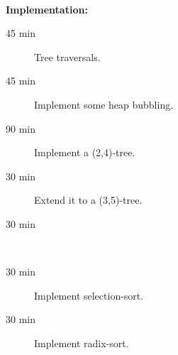 \hfill\\
\textbf{Implementation:}\\
\begin{description}
	\item[45 min] Tree traversals.
	\item[45 min] Implement some heap bubbling.
	\item[90 min] Implement a (2,4)-tree.
	\item[30 min] Extend it to a (3,5)-tree.
	\item[30 min] \hfill\\
	\item[30 min] Implement selection-sort.
	\item[30 min] Implement radix-sort.
\end{description}
